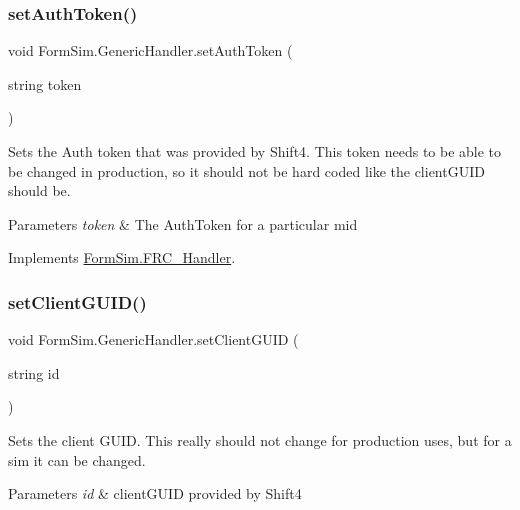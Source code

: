 \subsubsection{\texorpdfstring{set\+Auth\+Token()}{setAuthToken()}}
{\footnotesize\ttfamily void Form\+Sim.\+Generic\+Handler.\+set\+Auth\+Token (\begin{DoxyParamCaption}\item[{string}]{token }\end{DoxyParamCaption})\hspace{0.3cm}{\ttfamily [inline]}}



Sets the Auth token that was provided by Shift4. This token needs to be able to be changed in production, so it should not be hard coded like the client\+G\+U\+ID should be. 


\begin{DoxyParams}{Parameters}
{\em token} & The Auth\+Token for a particular mid\\
\hline
\end{DoxyParams}


Implements \mbox{\hyperlink{interface_form_sim_1_1_f_r_c___handler_a1314ea0937067435e3326818baa9d0c1}{Form\+Sim.\+F\+R\+C\+\_\+\+Handler}}.

\mbox{\label{class_form_sim_1_1_generic_handler_a3c934d9ba3f0efaadac331502ce0189c}} 
\subsubsection{\texorpdfstring{set\+Client\+G\+U\+I\+D()}{setClientGUID()}}
{\footnotesize\ttfamily void Form\+Sim.\+Generic\+Handler.\+set\+Client\+G\+U\+ID (\begin{DoxyParamCaption}\item[{string}]{id }\end{DoxyParamCaption})\hspace{0.3cm}{\ttfamily [inline]}}



Sets the client G\+U\+ID. This really should not change for production uses, but for a sim it can be changed. 


\begin{DoxyParams}{Parameters}
{\em id} & client\+G\+U\+ID provided by Shift4\\
\hline
\end{DoxyParams}


